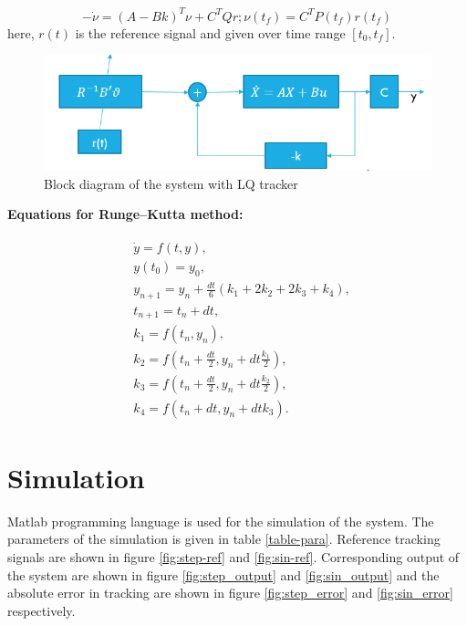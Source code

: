 \documentclass[12pt]{article}
\begin{document}
\begin{equation}
-\dot{\nu}=(A-Bk)^T\nu+C^TQr;\nu(t_f)=C^TP(t_f)r(t_f)
\label{riccarti2}
\end{equation}
here, $r(t)$ is the reference signal and given over time range $[t_0,t_f]$.\\
\begin{figure}[h]
	\centering
	\includegraphics[scale=0.7]{blockdiagram.png}
	\caption{Block diagram of the system with LQ tracker}
	\label{fig:blockdig}
\end{figure}
\newpage

\textbf{Equations for Runge–Kutta method:}

\begin{align}
\label{eqn:rkmethod}
\begin{split}
&\dot{y} = f(t,y) ,
\\
&y(t_0) = y_0 ,
\\
&y_{n+1} = y_n+\frac{dt}{6}(k_1+2k_2+2k_3+k_4),
\\
&t_{n+1}=t_n+dt,
\\
&k_1=f(t_n,y_n),
\\
&k_2=f(t_n+\frac{dt}{2},y_n+dt\frac{k_1}{2}),
\\
&k_3=f(t_n+\frac{dt}{2},y_n+dt\frac{k_2}{2}),
\\
&k_4=f(t_n+dt,y_n+dtk_3).
\end{split}
\end{align}


\section{Simulation}\label{Simulation}
Matlab  programming language is used for the simulation of the system. The parameters of the simulation is given in table \ref{table-para}. Reference tracking signals are shown in figure \ref{fig:step-ref} and \ref{fig:sin-ref}. Corresponding output of the system are shown in figure \ref{fig:step_output} and \ref{fig:sin_output} and the absolute error in tracking are shown in figure \ref{fig:step_error} and \ref{fig:sin_error} respectively.
\end{document}
